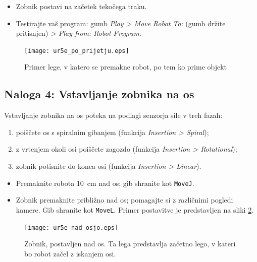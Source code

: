   \begin{mdframed}[backgroundcolor=yellow!20, shadow=true,roundcorner=8pt]
\begin{itemize}
    \item Zobnik postavi na začetek tekočega traku.
  \item Testirajte vaš program: gumb \emph{Play > Move Robot To:} (gumb držite pritisnjen) \emph{> Play from: Robot Program}.
\end{itemize}
\end{mdframed}



  \begin{figure}[!hbt]
\centering
 \texttt{[image: ur5e\_po\_prijetju.eps]}
\caption{Primer lege, v katero se premakne robot, po tem ko prime objekt}
\label{fig:ur_after}
\end{figure}


\subsection{Naloga 4: Vstavljanje zobnika na os}

Vstavljanje zobnika na os poteka na podlagi senzorja sile v treh fazah:
\begin{enumerate}
  \item poiščete os s spiralnim gibanjem (funkcija \emph{Insertion > Spiral});
  \item z vrtenjem okoli osi poiščete zagozdo (funkcija \emph{Insertion > Rotational});
  \item zobnik potisnite do konca osi (funkcija \emph{Insertion > Linear}).
\end{enumerate}


\begin{mdframed}[backgroundcolor=yellow!20, shadow=true,roundcorner=8pt]
\begin{itemize}
  \item Premaknite robota 10~cm nad os; gib shranite kot \verb"MoveJ".
  \item Zobnik premaknite približno nad os; pomagajte si z različnimi pogledi kamere. Gib shranite kot \verb"MoveL". Primer postavitve je predstavljen na sliki \ref{fig:ur_nad_osjo}.
\end{itemize}
\end{mdframed}
  \begin{figure}[!hbt]
\centering
 \texttt{[image: ur5e\_nad\_osjo.eps]}
\caption{Zobnik, postavljen nad os. Ta lega predstavlja začetno lego, v kateri bo robot začel z iskanjem osi.}
\label{fig:ur_nad_osjo}
\end{figure}

